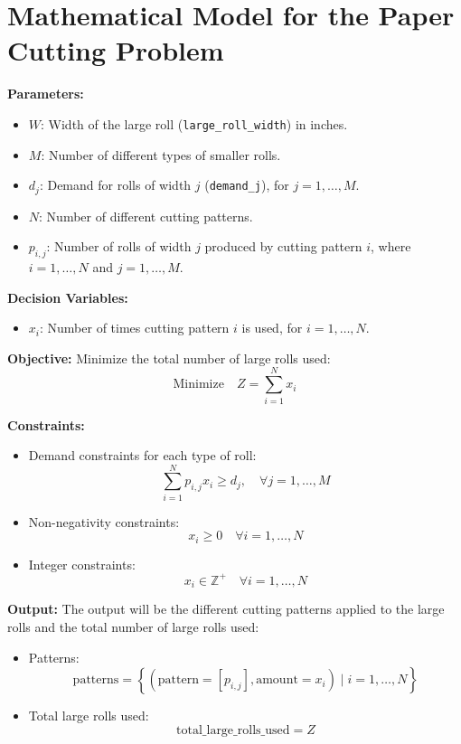 \documentclass{article}
\begin{document}
\section*{Mathematical Model for the Paper Cutting Problem}

\textbf{Parameters:}
\begin{itemize}
    \item $W$: Width of the large roll (\texttt{large\_roll\_width}) in inches.
    \item $M$: Number of different types of smaller rolls.
    \item $d_j$: Demand for rolls of width $j$ (\texttt{demand\_j}), for $j = 1, \ldots, M$.
    \item $N$: Number of different cutting patterns.
    \item $p_{i,j}$: Number of rolls of width $j$ produced by cutting pattern $i$, where $i = 1, \ldots, N$ and $j = 1, \ldots, M$.
\end{itemize}

\textbf{Decision Variables:}
\begin{itemize}
    \item $x_i$: Number of times cutting pattern $i$ is used, for $i = 1, \ldots, N$.
\end{itemize}

\textbf{Objective:}
Minimize the total number of large rolls used:
\[
\text{Minimize} \quad Z = \sum_{i=1}^{N} x_i
\]

\textbf{Constraints:}
\begin{itemize}
    \item Demand constraints for each type of roll:
    \[
    \sum_{i=1}^{N} p_{i,j} x_i \geq d_j, \quad \forall j = 1, \ldots, M
    \]
    \item Non-negativity constraints:
    \[
    x_i \geq 0 \quad \forall i = 1, \ldots, N
    \]
    \item Integer constraints:
    \[
    x_i \in \mathbb{Z}^+ \quad \forall i = 1, \ldots, N
    \]
\end{itemize}

\textbf{Output:}
The output will be the different cutting patterns applied to the large rolls and the total number of large rolls used:
\begin{itemize}
    \item Patterns:
    \[
    \text{patterns} = \left\{ \left( \text{pattern} = [p_{i,j}], \text{amount} = x_i \right) \mid i = 1, \ldots, N \right\}
    \]
    \item Total large rolls used:
    \[
    \text{total\_large\_rolls\_used} = Z
    \]
\end{itemize}
\end{document}
